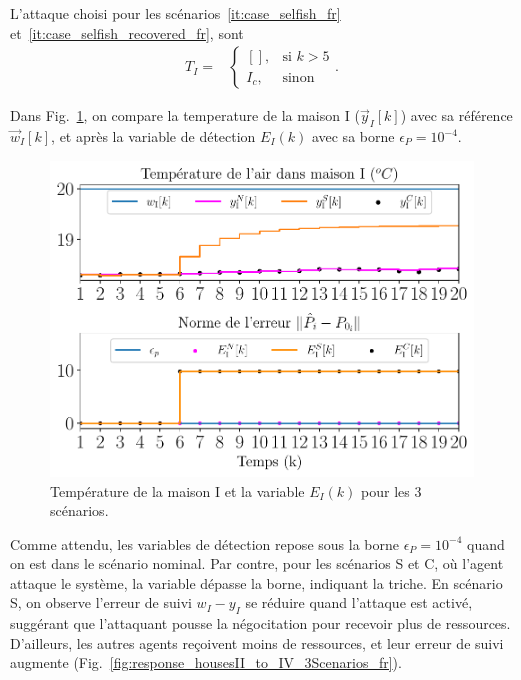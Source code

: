 \documentclass[../main.tex]{subfiles}
\begin{document}
L'attaque choisi pour les scénarios~\ref{it:case_selfish_fr} et~\ref{it:case_selfish_recovered_fr},
sont
\begin{align}
  T_{I}=&\begin{cases}
          \left[\right],&\text{si }k> 5\\
          I_{c},&\text{sinon}
        \end{cases}
.
\end{align}
\pagebreak

Dans Fig.~\ref{fig:response_houseI_3Scenarios_fr}, on compare la temperature de la maison I ($\vec{y}_{I}[k]$) avec sa référence $\vec{w}_{I}[k]$, et après la variable de détection ${E_{I}(k)}$ avec sa borne $\epsilon_{P}=10^{-4}$.

\begin{figure}[h]
  \centering
  \includegraphics[width=.65\textwidth]{../img/resilient_eq/ErrorWX_command_normErrH_fr.pdf}
\caption{Température de la maison I et la variable $E_{I}(k)$ pour les 3 scénarios.}\label{fig:response_houseI_3Scenarios_fr}
\end{figure}
Comme attendu, les variables de détection repose sous la borne $\epsilon_{P}=10^{-4}$ quand on est dans le scénario nominal.
Par contre, pour les scénarios S et C, où l'agent attaque le système, la variable dépasse la borne, indiquant la triche.
En scénario S, on observe l'erreur de suivi ${w_{I}-y_{I}}$ se réduire quand l'attaque est activé, suggérant que l'attaquant pousse la négocitation pour recevoir plus de ressources.
D'ailleurs, les autres agents reçoivent moins de ressources, et leur erreur de suivi augmente (Fig.~\ref{fig:response_housesII_to_IV_3Scenarios_fr}).
\end{document}
